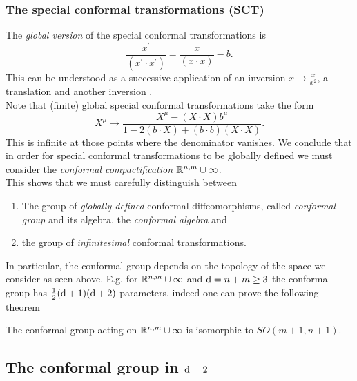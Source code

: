 \subsubsection{The special conformal transformations (SCT)}
The \emph{global version} of the special conformal transformations is
\begin{equation}
	\frac{x^\prime}{(x^\prime \cdot x^\prime)} = \frac{x}{(x \cdot x)} - b.
\end{equation}
This can be understood as a successive application of an inversion $x\rightarrow \frac{x}{x^2}$, a translation and another inversion .\\
Note that (finite) global special conformal transformations take the form
\begin{equation}
	X^\mu \rightarrow \frac{X^\mu - (X\cdot X) b^\mu}{1-2(b\cdot X) + (b\cdot b) (X\cdot X)}.
\end{equation}
This is infinite at those points where the denominator vanishes. We conclude that in order for special conformal transformations to be globally defined we must consider the \emph{conformal compactification} $\mathbb{R}^{n,m}\cup \infty$. \\
This shows that we must carefully distinguish between
\begin{enumerate}
	\item The group of \emph{globally defined} conformal diffeomorphisms, called \emph{conformal group} and its algebra, the \emph{conformal algebra} and
	\item the group of \emph{infinitesimal} conformal transformations.
\end{enumerate}
In particular, the conformal group depends on the topology of the space we consider as seen above. E.g. for $\mathbb{R}^{n,m} \cup \infty$ and $\mathrm{d} =n+m \geq 3$ the conformal group has $\frac{1}{2} (\mathrm{d}+1)(\mathrm{d}+2)$ parameters. indeed one can prove the following theorem
\begin{mybox}{}
The conformal group acting on $\mathbb{R}^{n,m} \cup \infty$ is isomorphic to $SO(m+1,n+1)$.
\end{mybox}
\subsection{The conformal group in $\mathrm{d}=2$}
